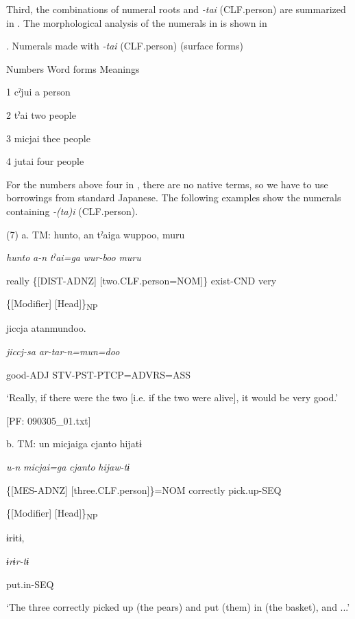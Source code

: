 Third, the combinations of numeral roots and \textit{{}-tai} (CLF.person) are summarized in . The morphological analysis of the numerals in  is shown in 

\begin{styleBeschriftung}
\textmd{}\textmd{. Numerals made with}\textmd{ \textit{-tai} }\textmd{(CLF.person) (surface forms)}
\end{styleBeschriftung}

Numbers  Word forms  Meanings

1  cˀjui  a person

2  tˀai  two people

3  micjai  thee people

4  jutai  four people

For the numbers above four in , there are no native terms, so we have to use borrowings from standard Japanese. The following examples show the numerals containing \textit{{}-(ta)i} (CLF.person).

(7)  a.  TM:  hunto,  an  tˀaiga  wuppoo,  muru

      \textit{hunto}  \textit{a-n}  \textit{tˀai=ga}  \textit{wur-boo}  \textit{muru}

      really  \{[DIST-ADNZ]  [two.CLF.person=NOM]\}  exist-CND  very

        \{[Modifier]  [Head]\}\textsubscript{NP}    

      jiccja  atanmundoo.

      \textit{jiccj-sa}  \textit{ar-tar-n=mun=doo}

      good-ADJ  STV-PST-PTCP=ADVRS=ASS

      ‘Really, if there were the two [i.e. if the two were alive], it would be very good.’

      [PF: 090305\_01.txt]

  b.  TM:  un  micjaiga  {\textbar}cjanto{\textbar}  hijatɨ

      \textit{u-n}  \textit{micjai=ga}  \textit{cjanto}  \textit{hijaw-tɨ}

      \{[MES-ADNZ]  [three.CLF.person]\}=NOM  correctly  pick.up-SEQ

      \{[Modifier]  [Head]\}\textsubscript{NP}    

      ɨrɨtɨ,

      \textit{ɨrɨr-tɨ}

      put.in-SEQ

      ‘The three correctly picked up (the pears) and put (them) in (the basket), and ...’


